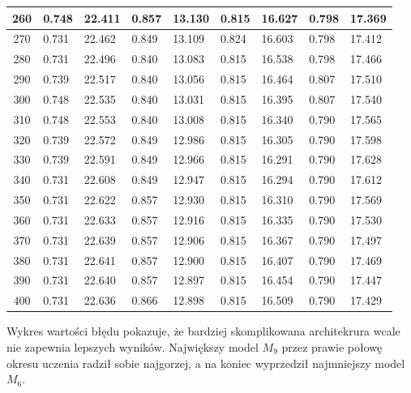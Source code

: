 \documentclass{report}
\begin{document}
\begin{minipage}{\textwidth}
\begin{longtable}{|c|l|l|l|l|l|l|l|l|}
                     260 & 0.748 & 22.411 & 0.857 & 13.130 & 0.815 & 16.627 & 0.798 & 17.369 \\ \hline
                     270 & 0.731 & 22.462 & 0.849 & 13.109 & 0.824 & 16.603 & 0.798 & 17.412 \\ \hline
                     280 & 0.731 & 22.496 & 0.840 & 13.083 & 0.815 & 16.538 & 0.798 & 17.466 \\ \hline
                     290 & 0.739 & 22.517 & 0.840 & 13.056 & 0.815 & 16.464 & 0.807 & 17.510 \\ \hline
                     300 & 0.748 & 22.535 & 0.840 & 13.031 & 0.815 & 16.395 & 0.807 & 17.540 \\ \hline
                     310 & 0.748 & 22.553 & 0.840 & 13.008 & 0.815 & 16.340 & 0.790 & 17.565 \\ \hline
                     320 & 0.739 & 22.572 & 0.849 & 12.986 & 0.815 & 16.305 & 0.790 & 17.598 \\ \hline
                     330 & 0.739 & 22.591 & 0.849 & 12.966 & 0.815 & 16.291 & 0.790 & 17.628 \\ \hline
                     340 & 0.731 & 22.608 & 0.849 & 12.947 & 0.815 & 16.294 & 0.790 & 17.612 \\ \hline
                     350 & 0.731 & 22.622 & 0.857 & 12.930 & 0.815 & 16.310 & 0.790 & 17.569 \\ \hline
                     360 & 0.731 & 22.633 & 0.857 & 12.916 & 0.815 & 16.335 & 0.790 & 17.530 \\ \hline
                     370 & 0.731 & 22.639 & 0.857 & 12.906 & 0.815 & 16.367 & 0.790 & 17.497 \\ \hline
                     380 & 0.731 & 22.641 & 0.857 & 12.900 & 0.815 & 16.407 & 0.790 & 17.469 \\ \hline
                     390 & 0.731 & 22.640 & 0.857 & 12.897 & 0.815 & 16.454 & 0.790 & 17.447 \\ \hline
                     400 & 0.731 & 22.636 & 0.866 & 12.898 & 0.815 & 16.509 & 0.790 & 17.429 \\ \hline
                 \end{longtable}
    \end{minipage}

    Wykres wartości błędu pokazuje, że bardziej skomplikowana architekrura wcale nie zapewnia lepszych wyników.
    Największy model $M_9$ przez prawie połowę okresu uczenia radził sobie najgorzej, a na koniec wyprzedził najmniejszy model $M_6$.
\end{document}

